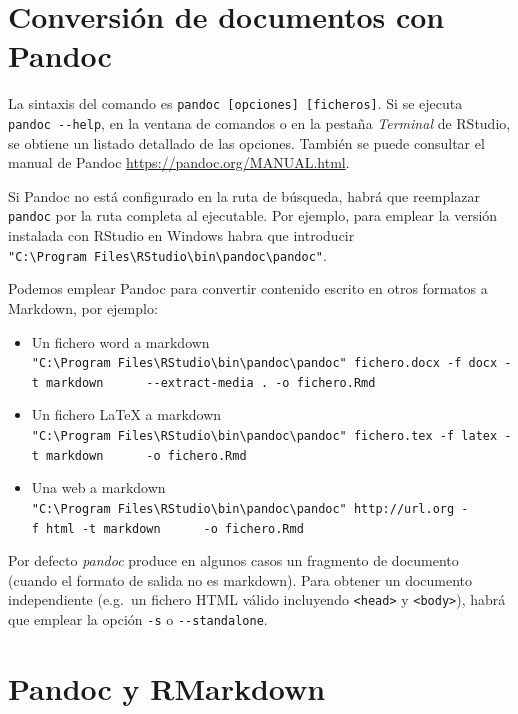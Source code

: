 \documentclass[
]{book}
\theoremstyle{definition}
\theoremstyle{definition}
\theoremstyle{definition}
\theoremstyle{definition}
\theoremstyle{remark}
\begin{document}
\hypertarget{conversion}{%
\section{Conversión de documentos con Pandoc}\label{conversion}}

La sintaxis del comando es \texttt{pandoc\ {[}opciones{]}\ {[}ficheros{]}}. Si se ejecuta \texttt{pandoc\ -\/-help},
en la ventana de comandos o en la pestaña \emph{Terminal} de RStudio, se obtiene un listado detallado de las opciones.
También se puede consultar el manual de Pandoc \url{https://pandoc.org/MANUAL.html}.

Si Pandoc no está configurado en la ruta de búsqueda, habrá que reemplazar \texttt{pandoc} por la ruta completa al ejecutable.
Por ejemplo, para emplear la versión instalada con RStudio en Windows habra que introducir \texttt{"C:\textbackslash{}Program\ Files\textbackslash{}RStudio\textbackslash{}bin\textbackslash{}pandoc\textbackslash{}pandoc"}.

Podemos emplear Pandoc para convertir contenido escrito en otros formatos a Markdown, por ejemplo:

\begin{itemize}
\item
  Un fichero word a markdown
  \texttt{"C:\textbackslash{}Program\ Files\textbackslash{}RStudio\textbackslash{}bin\textbackslash{}pandoc\textbackslash{}pandoc"\ fichero.docx\ -f\ docx\ -t\ markdown\ \ \ \ \ \ -\/-extract-media\ .\ -o\ fichero.Rmd}
\item
  Un fichero LaTeX a markdown
  \texttt{"C:\textbackslash{}Program\ Files\textbackslash{}RStudio\textbackslash{}bin\textbackslash{}pandoc\textbackslash{}pandoc"\ fichero.tex\ -f\ latex\ -t\ markdown\ \ \ \ \ \ -o\ fichero.Rmd}
\item
  Una web a markdown
  \texttt{"C:\textbackslash{}Program\ Files\textbackslash{}RStudio\textbackslash{}bin\textbackslash{}pandoc\textbackslash{}pandoc"\ http://url.org\ -f\ html\ -t\ markdown\ \ \ \ \ \ -o\ fichero.Rmd}
\end{itemize}

Por defecto \emph{pandoc} produce en algunos casos un fragmento de documento
(cuando el formato de salida no es markdown).
Para obtener un documento independiente (e.g.~un fichero HTML válido incluyendo \texttt{\textless{}head\textgreater{}} y \texttt{\textless{}body\textgreater{}}),
habrá que emplear la opción \texttt{-s} o \texttt{-\/-standalone}.

\hypertarget{pandoc-y-rmarkdown}{%
\section{Pandoc y RMarkdown}\label{pandoc-y-rmarkdown}}
\end{document}
